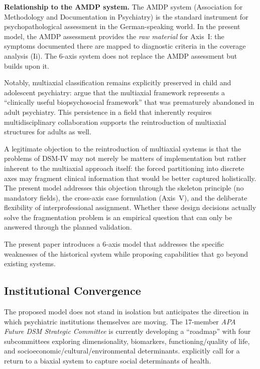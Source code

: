 \documentclass[11pt,a4paper]{article}
\begin{document}
\textbf{Relationship to the AMDP system.} The AMDP system (Association for Methodology and Documentation in Psychiatry) is the standard instrument for psychopathological assessment in the German-speaking world. In the present model, the AMDP assessment provides the \textit{raw material} for Axis~I: the symptoms documented there are mapped to diagnostic criteria in the coverage analysis (Ii). The 6-axis system does not replace the AMDP assessment but builds upon it.

Notably, multiaxial classification remains explicitly preserved in child and adolescent psychiatry: \citet{BJPsychAdv2024} argue that the multiaxial framework represents a ``clinically useful biopsychosocial framework'' that was prematurely abandoned in adult psychiatry. This persistence in a field that inherently requires multidisciplinary collaboration supports the reintroduction of multiaxial structures for adults as well.

A legitimate objection to the reintroduction of multiaxial systems is that the problems of DSM-IV may not merely be matters of implementation but rather inherent to the multiaxial approach itself: the forced partitioning into discrete axes may fragment clinical information that would be better captured holistically. The present model addresses this objection through the skeleton principle (no mandatory fields), the cross-axis case formulation (Axis~V), and the deliberate flexibility of interprofessional assignment. Whether these design decisions actually solve the fragmentation problem is an empirical question that can only be answered through the planned validation.

The present paper introduces a 6-axis model that addresses the specific weaknesses of the historical system while proposing capabilities that go beyond existing systems.

\subsection{Institutional Convergence}

The proposed model does not stand in isolation but anticipates the direction in which psychiatric institutions themselves are moving. The 17-member \textit{APA Future DSM Strategic Committee} is currently developing a ``roadmap'' with four subcommittees exploring dimensionality, biomarkers, functioning/quality of life, and socioeconomic/cultural/environmental determinants. \citet{ErlichFirst2025} explicitly call for a return to a biaxial system to capture social determinants of health.
\end{document}
